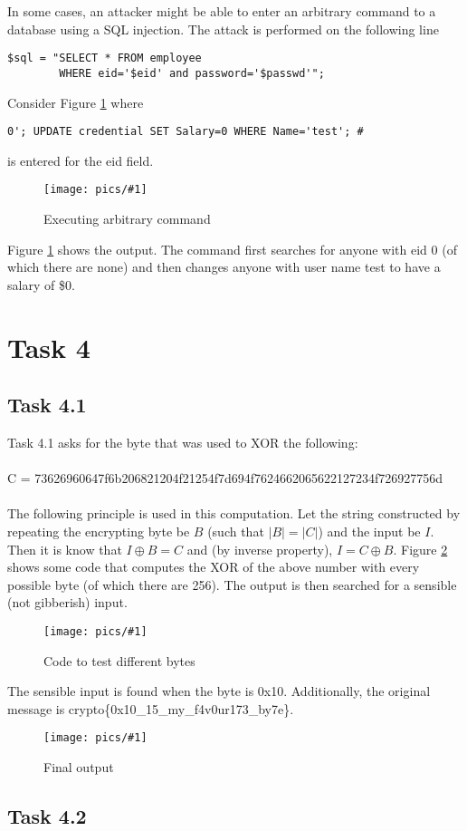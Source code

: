 \documentclass[11pt]{article}
\newcommand{\fig}[2]{ 
\begin{figure}[h]
	\centering
	\caption{#2}
	\texttt{[image: pics/\#1]}
	\label{fig:#1}
\end{figure} 
}
\begin{document}
In some cases, an attacker might be able to enter an arbitrary command to a database using a SQL injection. The attack is performed on the following line
\begin{verbatim}
$sql = "SELECT * FROM employee 
        WHERE eid='$eid' and password='$passwd'";
\end{verbatim}
Consider Figure \ref{fig:task3.3} where
\begin{verbatim}
0'; UPDATE credential SET Salary=0 WHERE Name='test'; #
\end{verbatim}
is entered for the eid field.
\newpage
\fig{task3.3}{Executing arbitrary command}

Figure \ref{fig:task3.3} shows the output. The command first searches for anyone with eid 0 (of which there are none) and then changes anyone with user name test to have a salary of \$0.

\newpage
\section*{Task 4}

\subsection*{Task 4.1}

Task 4.1 asks for the byte that was used to XOR the following: \\\\ C = 73626960647f6b206821204f21254f7d694f7624662065622127234f726927756d \\\\
The following principle is used in this computation. Let the string constructed by repeating the encrypting byte be $B$ (such that $|B| = |C|$) and the input be $I$. Then it is know that $ I \oplus B = C $ and (by inverse property), $ I  = C \oplus B $. Figure \ref{fig:task4.1.1} shows some code that computes the XOR of the above number with every possible byte (of which there are 256). The output is then searched for a sensible (not gibberish) input.

\fig{task4.1.1}{Code to test different bytes}

The sensible input is found when the byte is 0x10. Additionally, the original message is crypto\{0x10\_15\_my\_f4v0ur173\_by7e\}.

\fig{task4.1.2}{Final output}

\newpage
\subsection*{Task 4.2}
\end{document}
